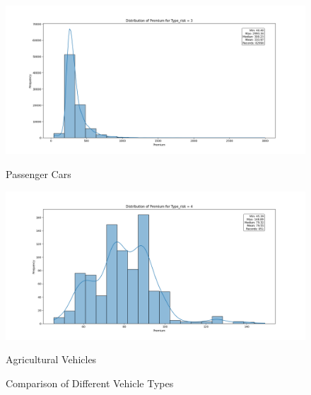 \documentclass{article}
\begin{document}
\begin{figure}[H]
    \centering
    \begin{minipage}{.5\textwidth}
        \centering
        \includegraphics[width=.8\linewidth]{images/premium_risk3.png} %
        \caption{Passenger Cars}
  
    \end{minipage}%
    \begin{minipage}{.5\textwidth}
        \centering
        \includegraphics[width=.8\linewidth]{images/premium_risk4.png} %
        \caption{Agricultural Vehicles}
        
    \end{minipage}
    \caption{Comparison of Different Vehicle Types}
\end{figure}
\end{document}
